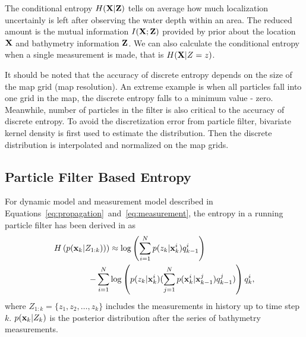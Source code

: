 The conditional entropy $H({\bf X}|{\bf Z})$ tells on average how much localization uncertainly is left after observing the water depth within an area. The reduced amount is the mutual information $I({\bf X};{\bf Z})$ provided by prior about the location $\bf X$ and bathymetry information $\bf Z$. We can also calculate the conditional entropy when a single measurement is made, that is $H({\bf X}|Z=z)$.

It should be noted that the accuracy of discrete entropy depends on the size of the map grid (map resolution). An extreme example is when all particles fall into one grid in the map, the discrete entropy falls to a minimum value - zero. Meanwhile, number of particles in the filter is also critical to the accuracy of discrete entropy. To avoid the discretization error from particle filter, bivariate kernel density \cite{botev2010} is first used to estimate the distribution. Then the discrete distribution is interpolated and normalized on the map grids.

\subsection{Particle Filter Based Entropy}

For dynamic model and measurement model described in Equations~\eqref{eq:propagation}~and~\eqref{eq:measurement}, the entropy in a running particle filter has been derived in \cite{Bpers2010} as
\begin{equation}
\begin{aligned}
\label{eq:PFentropy}
H\left(p({\bf x}_k|Z_{1:k}))\right)&\approx \log\left(\sum_{i=1}^Np(z_k|{\bf x}_k^i)q_{k-1}^i\right) \\
-\sum_{i=1}^N&\log\left(p(z_k|{\bf x}_k^i)(\sum_{j=1}^Np({\bf x}_k^i|{\bf x}_{k-1}^j)q_{k-1}^j)\right)q_k^i,
\end{aligned}
\end{equation}
where $Z_{1:k}=\{z_1,z_2,\ldots,z_k\}$ includes the measurements in history up to time step $k$. $p({\bf x}_k|Z_k)$ is the posterior distribution after the series of bathymetry measurements.

